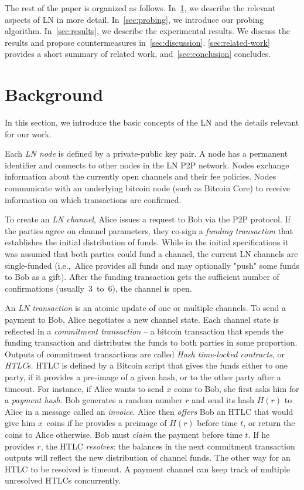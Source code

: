 The rest of the paper is organized as follows.
In~\cref{sec:background}, we describe the relevant aspects of LN in more detail.
In~\cref{sec:probing}, we introduce our probing algorithm.
In~\cref{sec:results}, we describe the experimental results.
We discuss the results and propose countermeasures in~\cref{sec:discussion}.
\cref{sec:related-work} provides a short summary of related work, and~\cref{sec:conclusion} concludes.




\section{Background} \label{sec:background}
In this section, we introduce the basic concepts of the LN and the details relevant for our work.

Each \textit{LN node} is defined by a private-public key pair.
A node has a permanent identifier and connects to other nodes in the LN P2P network.
Nodes exchange information about the currently open channels and their fee policies.
Nodes communicate with an underlying bitcoin node (such as Bitcoin Core) to receive information on which transactions are confirmed.

To create an \textit{LN channel}, Alice issues a request to Bob via the P2P protocol.
If the parties agree on channel parameters, they co-sign a \textit{funding transaction} that establishes the initial distribution of funds.
While in the initial specifications it was assumed that both parties could fund a channel, the current LN channels are single-funded (i.e.,~Alice provides all funds and may optionally "push" some funds to Bob as a gift).
After the funding transaction gets the sufficient number of confirmations (usually~$3$~to~$6$), the channel is open.

An \textit{LN transaction} is an atomic update of one or multiple channels.
To send a payment to Bob, Alice negotiates a new channel state.
Each channel state is reflected in a \textit{commitment transaction} -- a bitcoin transaction that spends the funding transaction and distributes the funds to both parties in some proportion.
Outputs of commitment transactions are called \textit{Hash time-locked contracts}, or \textit{HTLC}s.
HTLC is defined by a Bitcoin script that gives the funds either to one party, if it provides a pre-image of a given hash, or to the other party after a timeout.
For instance, if Alice wants to send $x$ coins to Bob, she first asks him for a \textit{payment hash}.
Bob generates a random number $r$ and send its hash $H(r)$ to Alice in a message called an \textit{invoice}.
Alice then \textit{offers} Bob an HTLC that would give him $x$~coins if he provides a preimage of $H(r)$ before time $t$, or return the coins to Alice otherwise.
Bob must \textit{claim} the payment before time $t$.
If he provides $r$, the HTLC \textit{resolves}: the balances in the next commitment transaction outputs will reflect the new distribution of channel funds.
The other way for an HTLC to be resolved is timeout.
A payment channel can keep track of multiple unresolved HTLCs concurrently.

